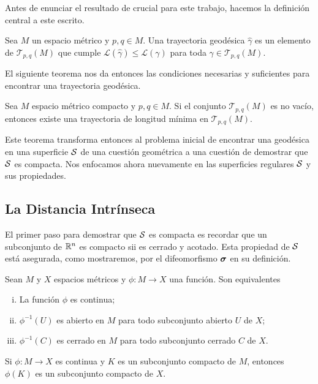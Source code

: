 Antes de enunciar el resultado de \parencite{clapp-2010} crucial para este trabajo, hacemos la definición central a este escrito.

\begin{definition}
	Sea $M$ un espacio métrico y $p, q \in M$. Una trayectoria geodésica $\hat{\gamma}$ es un elemento de $\mathcal T_{p, q}(M)$ que cumple $\mathscr L(\hat \gamma) \le \mathscr L( \gamma)$ para toda $\gamma \in \mathcal T_{p, q}(M)$.
\end{definition}
El siguiente teorema nos da entonces las condiciones necesarias y suficientes para encontrar una trayectoria geodésica.
 
\begin{theorem}
	Sea $M$ espacio métrico compacto y $p, q \in M$. Si el conjunto $\mathcal T_{p, q}(M)$ es no vacío, entonces existe una trayectoria de longitud mínima en $\mathcal T_{p, q}(M)$.
\end{theorem}

Este teorema transforma entonces al problema inicial de encontrar una geodésica en una superficie $\mathcal S$ de una cuestión geométrica a una cuestión de demostrar que $\mathcal S$ es compacta. Nos enfocamos ahora nuevamente en las superficies regulares $\mathcal S$ y sus propiedades.

\subsection{La Distancia Intrínseca}
El primer paso para demostrar que $\mathcal S$ es compacta es recordar que un subconjunto de $\mathbb R^n$ es compacto sii es cerrado y acotado. Esta propiedad de $\mathcal S$ está asegurada, como mostraremos, por el difeomorfismo $\boldsymbol{\sigma}$ en su definición.

\begin{proposition}
	Sean $M$ y $X$ espacios métricos y $\phi : M \to X$ una función. Son equivalentes
	\begin{enumerate}[(i)]
		\item La función $\phi$ es continua;
		\item $\phi^{-1}(U)$ es abierto en $M$ para todo subconjunto abierto $U$ de $X$;
		\item  $\phi^{-1}(C)$ es cerrado en $M$ para todo subconjunto cerrado $C$ de $X$.
	\end{enumerate}
\end{proposition}

\begin{proposition}
	Si $\phi : M \to X$ es continua y $K$ es un subconjunto compacto de $M$, entonces $\phi(K)$ es un subconjunto compacto de $X$.
\end{proposition}

